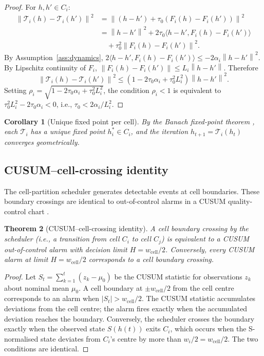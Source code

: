\documentclass[11pt,twocolumn,a4paper]{article}
\theoremstyle{plain}
\newtheorem{theorem}{Theorem}[section]
\newtheorem{corollary}[theorem]{Corollary}
\theoremstyle{definition}
\theoremstyle{remark}
\newcommand{\T}{\mathcal{T}}
\newcommand{\tick}{\tau_0}
\newcommand{\norm}[1]{\left\|#1\right\|}
\newcommand{\cell}{\mathrm{cell}}
\newcommand{\Scal}{S}
\begin{document}
\begin{proof}
For $h, h' \in C_i$:
\begin{align*}
  \norm{\T_i(h) - \T_i(h')}^2 &= \norm{(h - h') + \tick(F_i(h) - F_i(h'))}^2 \\
  &= \norm{h-h'}^2 + 2\tick\langle h-h', F_i(h) - F_i(h')\rangle \\
  &\quad + \tick^2\norm{F_i(h) - F_i(h')}^2.
\end{align*}
By Assumption~\ref{ass:dynamics}, $2\langle h-h', F_i(h) - F_i(h')\rangle \leq -2\alpha_i\norm{h-h'}^2$. By Lipschitz continuity of $F_i$, $\norm{F_i(h) - F_i(h')} \leq L_i\norm{h-h'}$. Therefore
\[
  \norm{\T_i(h) - \T_i(h')}^2 \leq (1 - 2\tick\alpha_i + \tick^2 L_i^2)\norm{h-h'}^2.
\]
Setting $\rho_i = \sqrt{1 - 2\tick\alpha_i + \tick^2 L_i^2}$, the condition $\rho_i < 1$ is equivalent to $\tick^2 L_i^2 - 2\tick\alpha_i < 0$, i.e., $\tick < 2\alpha_i/L_i^2$.
\end{proof}

\begin{corollary}[Unique fixed point per cell]
By the Banach fixed-point theorem \cite{banach1922}, each $\T_i$ has a unique fixed point $h_i^* \in C_i$, and the iteration $h_{t+1} = \T_i(h_t)$ converges geometrically.
\end{corollary}

\subsection{CUSUM--cell-crossing identity}

The cell-partition scheduler generates detectable events at cell boundaries. These boundary crossings are identical to out-of-control alarms in a CUSUM quality-control chart \cite{cusum1954}.

\begin{theorem}[CUSUM--cell-crossing identity]
\label{thm:cusum}
A cell boundary crossing by the scheduler (i.e., a transition from cell $C_i$ to cell $C_j$) is equivalent to a CUSUM out-of-control alarm with decision limit $H = w_{\cell}/2$. Conversely, every CUSUM alarm at limit $H = w_{\cell}/2$ corresponds to a cell boundary crossing.
\end{theorem}

\begin{proof}
Let $S_t = \sum_{k=1}^t (z_k - \mu_0)$ be the CUSUM statistic for observations $z_k$ about nominal mean $\mu_0$. A cell boundary at $\pm w_{\cell}/2$ from the cell centre corresponds to an alarm when $|S_t| > w_{\cell}/2$. The CUSUM statistic accumulates deviations from the cell centre; the alarm fires exactly when the accumulated deviation reaches the boundary. Conversely, the scheduler crosses the boundary exactly when the observed state $\Scal(h(t))$ exits $C_i$, which occurs when the S-normalised state deviates from $C_i$'s centre by more than $w_i/2 = w_{\cell}/2$. The two conditions are identical.
\end{proof}
\end{document}
